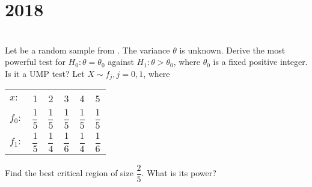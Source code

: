 \section*{2018}
\vspace{-.5cm}
\hrulefill \smallskip\\
 Let \xton be a random sample from . The variance $\theta$ is unknown. Derive the most powerful test for $H_0 : \theta = \theta_0$ against $H_1:\theta > \theta_0$, where $\theta_0$ is a fixed positive integer. Is it a UMP test?
\myline
{} Let $X\sim f_j, j = 0,1$, where
\begin{center}
    \begin{tabular}{l*{5}{c}}
        $x:$ & 1 & 2 & 3 & 4 & 5\\
        $f_0:$ & $\dfrac{1}{5}$ & $\dfrac{1}{5}$ & $\dfrac{1}{5}$ & $\dfrac{1}{5}$ & $\dfrac{1}{5}$ \\
        $f_1:$ & $\dfrac{1}{5}$ & $\dfrac{1}{4}$ & $\dfrac{1}{6}$ & $\dfrac{1}{4}$ & $\dfrac{1}{6}$ 
    \end{tabular}
\end{center} Find the best critical region of size $\dfrac{2}{5}$. What is its power?